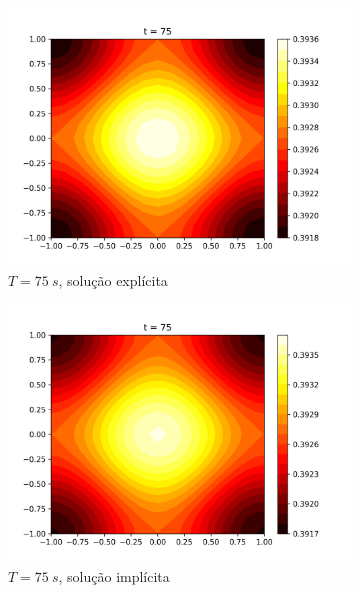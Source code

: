 \documentclass{article}
\begin{document}
\begin{figure}
\begin{subfigure}[b]{0.49\textwidth}
         \includegraphics[width=\textwidth]{figs/q7a_heatmap_t75.png}
         \caption{$T=75~s$, solução explícita}
	\label{fig:q7a_heatmap_t75}
     \end{subfigure}
     \hfill
     \begin{subfigure}[b]{0.49\textwidth}
         \centering
     \includegraphics[width=\textwidth]{figs/q7b_heatmap_t75.png}
         \caption{$T=75~s$, solução implícita}
	\label{fig:q7b_heatmap_t75}
     \end{subfigure}
     \begin{subfigure}[b]{0.49\textwidth}
         \centering

\end{subfigure}
\end{figure}
\end{document}
